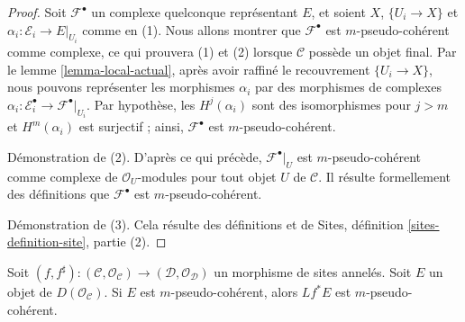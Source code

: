 \begin{proof}
Soit $\mathcal{F}^\bullet$ un complexe quelconque représentant $E$, et
soient $X$, $\{U_i \to X\}$ et
$\alpha_i : \mathcal{E}_i \to E|_{U_i}$ comme en (1). Nous allons montrer
que $\mathcal{F}^\bullet$ est $m$-pseudo-cohérent comme complexe, ce qui
prouvera (1) et (2) lorsque $\mathcal{C}$ possède un objet final. Par le lemme
\ref{lemma-local-actual}, après avoir raffiné le recouvrement
$\{U_i \to X\}$, nous pouvons représenter les morphismes $\alpha_i$ par des
morphismes de complexes
$\alpha_i : \mathcal{E}_i^\bullet \to \mathcal{F}^\bullet|_{U_i}$.
Par hypothèse, les $H^j(\alpha_i)$ sont des isomorphismes pour $j > m$ et
$H^m(\alpha_i)$ est surjectif ; ainsi, $\mathcal{F}^\bullet$ est
$m$-pseudo-cohérent.

\medskip\noindent
Démonstration de (2). D'après ce qui précède,
$\mathcal{F}^\bullet|_U$ est $m$-pseudo-cohérent comme complexe de
$\mathcal{O}_U$-modules pour tout objet $U$ de $\mathcal{C}$. Il résulte
formellement des définitions que $\mathcal{F}^\bullet$ est
$m$-pseudo-cohérent.

\medskip\noindent
Démonstration de (3). Cela résulte des définitions et de Sites,
définition \ref{sites-definition-site}, partie (2).
\end{proof}

\begin{lemma}
\label{lemma-pseudo-coherent-pullback}
Soit $(f, f^\sharp) : (\mathcal{C}, \mathcal{O}_\mathcal{C}) \to
(\mathcal{D}, \mathcal{O}_\mathcal{D})$
un morphisme de sites annelés. Soit $E$ un objet de
$D(\mathcal{O}_\mathcal{C})$. Si $E$ est $m$-pseudo-cohérent,
alors $Lf^*E$ est $m$-pseudo-cohérent.
\end{lemma}

